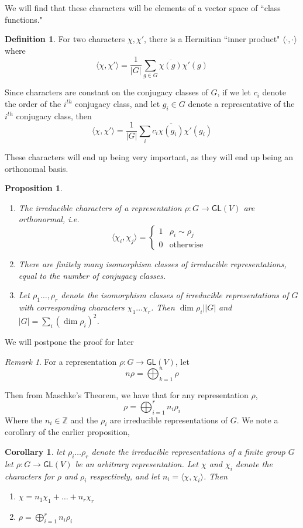 \documentclass[psamsfonts]{amsart}
\newtheorem{cor}[thm]{Corollary}
\newtheorem{prop}[thm]{Proposition}
\theoremstyle{definition}
\newtheorem{defn}[thm]{Definition}
\theoremstyle{remark}
\newtheorem*{rem*}{Remark}
\newcommand{\Z}{\mathbb{Z}}
\newcommand{\GL}{\mathsf{GL}}
\newcommand{\abs}[1]{\left\lvert#1\right\rvert}
\begin{document}
We will find that these characters will be elements of a vector space of ``class functions."
\begin{defn}
For two characters $\chi, \chi'$, there is a Hermitian ``inner product" $\langle \cdot, \cdot \rangle$ where
$$\langle \chi, \chi' \rangle = \frac{1}{\abs{G}}\sum_{g \in G} \overline{\chi(g)}\chi'(g) $$
\end{defn}

Since characters are constant on the conjugacy classes of $G$, if we let $c_i$ denote the order of the $i^{th}$ conjugacy class, and let $g_i \in G$ denote a representative of the $i^{th}$ conjugacy class, then
$$\langle \chi, \chi' \rangle = \frac{1}{\abs{G}}\sum_i c_i \overline{\chi(g_i)}\chi'(g_i) $$

These characters will end up being very important, as they will end up being an orthonomal basis.
\begin{prop}\ \\ \vspace{-\baselineskip}
\begin{enumerate}
\item The irreducible characters of a representation $\rho: G \to \GL(V)$ are orthonormal, i.e.
$$\langle \chi_i, \chi_j \rangle = \begin{cases}
1 & \rho_i \sim \rho_j \\
0 & \text{otherwise}
\end{cases} $$
\item There are finitely many isomorphism classes of irreducible representations, equal to the number of conjugacy classes.
\item Let $\rho_1 \ldots, \rho_r$ denote the isomorphism classes of irreducible representations of $G$ with corresponding characters $\chi_1 \ldots \chi_r$. Then $\dim \rho_i \big\vert \abs{G}$ and $\abs{G} = \sum_i (\dim \rho_i)^2$.
\end{enumerate}
\end{prop}

We will postpone the proof for later \\

\begin{rem*}
For a representation $\rho: G\to \GL(V)$, let 
$$n\rho = \bigoplus_{k = 1}^n \rho $$
\end{rem*}

Then from Maschke's Theorem, we have that for any representation $\rho$,
$$\rho = \bigoplus_{i = 1}^r n_i\rho_i $$
Where the $n_i \in \Z$ and the $\rho_i$ are irreducible representations of $G$. We note a corollary of the earlier proposition,
\begin{cor}
let $\rho_i \ldots \rho_r$ denote the irreducible representations of a finite group $G$ let $\rho: G \to \GL(V)$ be an arbitrary representation. Let $\chi$ and $\chi_i$ denote the characters for $\rho$ and $\rho_i$ respectively, and let $n_i = \langle \chi, \chi_i \rangle$. Then 
\begin{enumerate}
\item $\chi = n_1\chi_1 + \ldots + n_r\chi_r$
\item $\rho = \bigoplus_{i = 1}^r n_i \rho_i$
\end{enumerate}
\end{cor}
\end{document}

